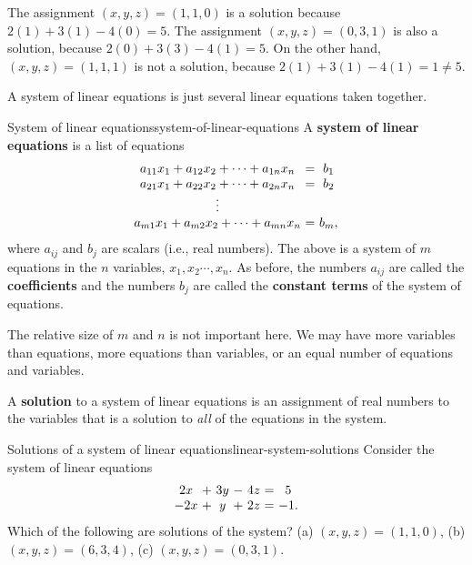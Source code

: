 \begin{solution}
  The assignment $(x,y,z) = (1,1,0)$ is a solution because
  $2(1)+3(1)-4(0) = 5$. The assignment $(x,y,z) = (0,3,1)$ is also a
  solution, because $2(0) + 3(3) - 4(1) = 5$. On the other hand,
  $(x,y,z) = (1,1,1)$ is not a solution, because
  $2(1) + 3(1)-4(1) = 1 \neq 5$.
\end{solution}

A system of linear equations is just several linear equations taken together.

\begin{definition}{System of linear equations}{system-of-linear-equations}
A \textbf{system of linear equations} is a list of equations
\begin{equation*}
\begin{array}{c@{~}c@{~}c}
a_{11}x_{1}+a_{12}x_{2}+\cdots +a_{1n}x_{n}&=&b_{1} \\
a_{21}x_{1}+a_{22}x_{2}+\cdots +a_{2n}x_{n}&=&b_{2} \\
\vdots \\
a_{m1}x_{1}+a_{m2}x_{2}+\cdots +a_{mn}x_{n}&=&b_{m},
\end{array}
\end{equation*}
where $a_{ij}$ and $b_{j}$ are scalars (i.e., real numbers). The above
is a system of $m$ equations in the $n$ variables,
$x_{1},x_{2}\cdots ,x_{n}$.  As before, the numbers $a_{ij}$ are
called the \textbf{coefficients} and the numbers
$b_{j}$ are called the \textbf{constant terms} of
the system of equations.
\end{definition}

The relative size of $m$ and $n$ is not important here. We may have
more variables than equations, more equations than variables, or an
equal number of equations and variables. 

A \textbf{solution} to a
system of linear equations is an assignment of real numbers to the
variables that is a solution to {\em all} of the equations in the
system.

\begin{example}{Solutions of a system of linear equations}{linear-system-solutions}
  Consider the system of linear equations
  \begin{equation*}
    \begin{array}{c@{~}c@{~}c@{~}c@{~}c@{~}c@{~}c}
      2x&+&3y&-&4z &=& 5\\
      -2x&+&y&+&2z &=& -1.
    \end{array}
  \end{equation*}  
  Which of the following are solutions of the system? (a)
  $(x,y,z)=(1,1,0)$, (b) $(x,y,z)=(6,3,4)$, (c) $(x,y,z)=(0,3,1)$.
\end{example}

